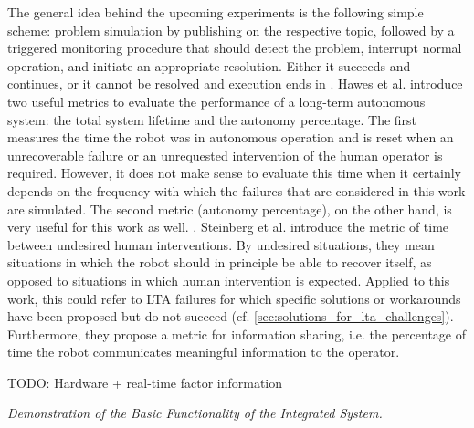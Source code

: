 \documentclass[english, master, utf8]{base/thesis_KBS}
\newcommand{\code}{\collectverb{\codebox}}
\begin{document}
The general idea behind the upcoming experiments is the following simple scheme: problem simulation by publishing on the respective topic, followed by a triggered monitoring
procedure that should detect the problem, interrupt normal operation, and initiate an appropriate resolution. Either it succeeds and \code{NORMAL_OPERATION} continues, or it cannot be
resolved and execution ends in \code{CATASTROPHE}.\newline
Hawes et al. introduce two useful metrics to evaluate the performance of a long-term autonomous system: the total system lifetime and the autonomy percentage. \cite{Hawes:2017} The
first measures the time the robot was in autonomous operation and is reset when an unrecoverable failure or an unrequested intervention of the human operator is required. However,
it does not make sense to evaluate this time when it certainly depends on the frequency with which the failures that are considered in this work are simulated. The second metric
(autonomy percentage), on the other hand, is very useful for this work as well. . \cite{Hawes:2017}
Steinberg et al. \cite{Steinberg:2016} introduce the metric of time between undesired human interventions. By undesired situations, they mean situations in which the robot should
in principle be able to recover itself, as opposed to situations in which human intervention is expected. Applied to this work, this could refer to LTA failures for which specific
solutions or workarounds have been proposed but do not succeed (cf. \ref{sec:solutions_for_lta_challenges}). Furthermore, they propose a metric for information sharing, i.e. the
percentage of time the robot communicates meaningful information to the operator.\newline

TODO: Hardware + real-time factor information\newline

\noindent
\textit{Demonstration of the Basic Functionality of the Integrated System.}\newline
\end{document}
